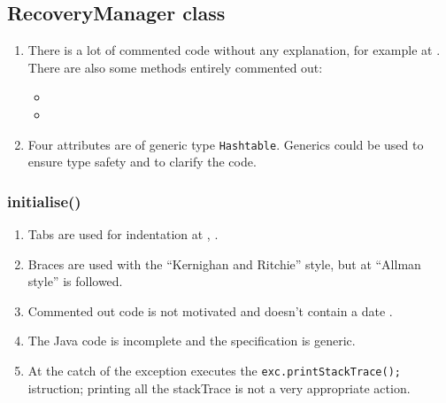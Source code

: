 \subsection{RecoveryManager class}
\label{sec:recoverymanager-class}

\begin{enumerate}
	\item {} There is a lot of commented code without any explanation, for example at . There are also some methods entirely commented out:
	\begin{itemize}
		\item {}
		\item {}
	\end{itemize}
	\item {} Four attributes are of generic type \texttt{Hashtable}. Generics could be used to ensure type safety and to clarify the code.
	     
\end{enumerate}


\subsubsection{initialise()}
\begin{enumerate}
    \item {} Tabs are used for indentation at , .
    \item {} Braces are used with the ``Kernighan and Ritchie'' style, but at  ``Allman style'' is followed.
    \item {} Commented out code is not motivated and doesn't contain a date .
    \item {} The Java code is incomplete and the specification is generic.
    \item {} At  the catch of the exception executes the \texttt{exc.printStackTrace();} istruction; printing all the stackTrace is not a very appropriate action.
\end{enumerate}
